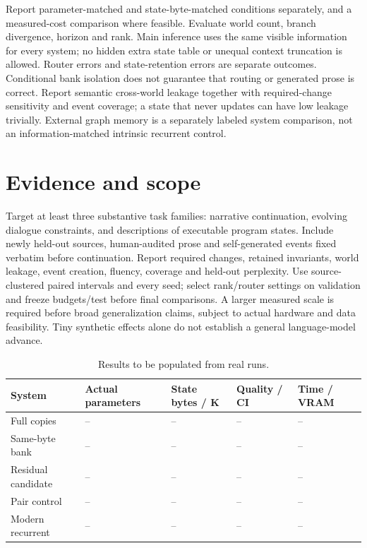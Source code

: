 \documentclass[11pt,a4paper]{article}
\begin{document}
Report parameter-matched and state-byte-matched conditions separately, and a
measured-cost comparison where feasible. Evaluate world count, branch divergence,
horizon and rank. Main inference uses the same visible information for every
system; no hidden extra state table or unequal context truncation is allowed.
Router errors and state-retention errors are separate outcomes. Conditional
bank isolation does not guarantee that routing or generated prose is correct.
Report semantic cross-world leakage together with required-change sensitivity
and event coverage; a state that never updates can have low leakage trivially.
External graph memory is a separately labeled system comparison, not an
information-matched intrinsic recurrent control.

\section{Evidence and scope}
Target at least three substantive task families: narrative continuation,
evolving dialogue constraints, and descriptions of executable program states.
Include newly held-out sources, human-audited prose and self-generated events
fixed verbatim before continuation. Report required changes, retained invariants,
world leakage, event creation, fluency, coverage and held-out perplexity.
Use source-clustered paired intervals and every seed; select rank/router settings
on validation and freeze budgets/test before final comparisons. A larger measured
scale is required before broad generalization claims, subject to actual hardware
and data feasibility. Tiny synthetic effects alone do not establish a general
language-model advance.

\begin{table}[ht]\centering\small
\caption{Results to be populated from real runs.}
\begin{tabularx}{\linewidth}{lYYYY}\toprule
System & Actual parameters & State bytes / K & Quality / CI & Time / VRAM\\\midrule
Full copies & -- & -- & -- & --\\Same-byte bank & -- & -- & -- & --\\
Residual candidate & -- & -- & -- & --\\Pair control & -- & -- & -- & --\\
Modern recurrent & -- & -- & -- & --\\\bottomrule\end{tabularx}\end{table}
\end{document}
